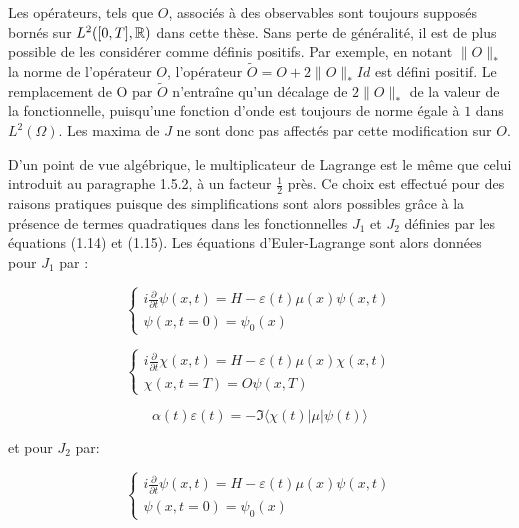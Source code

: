 \begin{remark}

Les opérateurs, tels que $O$, associés à des observables sont toujours supposés bornés sur $L^2 ([0, T ], \mathbb R)$ dans cette thèse. Sans perte de généralité, il est de plus possible de les considérer comme définis positifs. Par exemple, en notant $\lVert O \rVert_*$ la norme de l'opérateur $O$, l’opérateur $\tilde{O} = O + 2\lVert O \rVert_* Id$ est défini positif. Le remplacement de O par $\tilde{O}$ n’entraîne qu'un décalage de $ 2 \lVert O \rVert_*$ de la valeur de la fonctionnelle, puisqu'une fonction d'onde est toujours de norme égale à $1$ dans $L^2 (\Omega)$. Les maxima de $J$ ne sont donc pas affectés par cette modification sur $O$.

\end{remark}

D’un point de vue algébrique, le multiplicateur de Lagrange est le même que celui introduit au paragraphe 1.5.2, à un facteur $\frac{1}{2} $ près. Ce choix est effectué pour des raisons pratiques puisque des simplifications sont alors possibles grâce à la présence de termes quadratiques dans les fonctionnelles $J_1$ et $J_2$ définies par les équations (1.14) et (1.15). Les équations d'Euler-Lagrange sont alors données pour $J_1$ par :

\begin{equation}
\begin{cases}
i \frac{\partial}{\partial t} \psi (x,t) = H - \varepsilon(t)\mu(x)\psi(x,t)\\
\psi(x,t=0)=\psi_0(x)
\end{cases}
\end{equation}

\begin{equation}
\begin{cases}
i \frac{\partial}{\partial t} \chi (x,t) = H - \varepsilon(t)\mu(x)\chi(x,t)\\
\chi(x,t=T)=O\psi(x,T)
\end{cases}
\end{equation}

\begin{equation}
\alpha(t)\varepsilon(t) = -\Im \langle \chi(t)|\mu|\psi(t)\rangle 
\end{equation}

et pour $J_2$ par:

\begin{equation}
\begin{cases}
i \frac{\partial}{\partial t} \psi (x,t) = H - \varepsilon(t)\mu(x)\psi(x,t)\\
\psi(x,t=0)=\psi_0(x)
\end{cases}
\end{equation}

